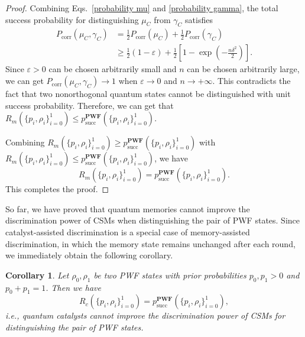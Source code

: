 \documentclass[aps,pra,twocolumn,floatfix,amsfonts,10pt]{revtex4-2}
\newtheorem{corollary}{Corollary}
\begin{document}
\begin{proof}
	Combining Eqs.~\eqref{probability mu} and \eqref{probability gamma}, the total success probability for distinguishing $\mu_C$ from $\gamma_C$ satisfies
	\begin{equation}
		\begin{aligned}
			P_{\mathrm{corr}}(\mu_C,\gamma_C) &= \frac{1}{2}P_{\mathrm{corr}}(\mu_C) + \frac{1}{2}P_{\mathrm{corr}}(\gamma_C) \\ &\geqslant \frac{1}{2}(1-\varepsilon) + \frac{1}{2} \left[ 1-\exp\left(-\frac{n\delta^2}{2}\right)\right].
		\end{aligned}
	\end{equation}
	Since $\varepsilon>0$ can be chosen arbitrarily small and $n$ can be chosen arbitrarily large, we can get $P_{\mathrm{corr}}(\mu_C,\gamma_C) \rightarrow 1$ when $\varepsilon \rightarrow 0$ and $n \rightarrow + \infty$. 
	This contradicts the fact that two nonorthogonal quantum states cannot be distinguished with unit success probability.
	Therefore, we can get that $R_m\left(\{p_i,\rho_i\}_{i=0}^{1}\right) \leqslant p_{\mathrm{succ}}^{\mathbf{PWF}}\left(\{p_i,\rho_i\}_{i=0}^{1}\right)$.
	
	Combining $R_m\left(\{p_i,\rho_i\}_{i=0}^{1}\right) \geqslant p_{\mathrm{succ}}^{\mathbf{PWF}}\left(\{p_i,\rho_i\}_{i=0}^{1}\right)$ with $R_m\left(\{p_i,\rho_i\}_{i=0}^{1}\right) \leqslant p_{\mathrm{succ}}^{\mathbf{PWF}}\left(\{p_i,\rho_i\}_{i=0}^{1}\right)$, we have
	\begin{equation}
		R_m\left(\{p_i,\rho_i\}_{i=0}^{1}\right) = p_{\mathrm{succ}}^{\mathbf{PWF}}\left(\{p_i,\rho_i\}_{i=0}^{1}\right).
	\end{equation}
	This completes the proof.
\end{proof}

So far, we have proved that quantum memories cannot improve the discrimination power of CSMs when distinguishing the pair of PWF states.
Since catalyst-assisted discrimination is a special case of memory-assisted discrimination, in which the memory state remains unchanged after each round, we immediately obtain the following corollary.

\begin{corollary}
	Let $\rho_0,\rho_1$ be two PWF states with prior probabilities $p_0,p_1>0$ and $p_0+p_1=1$. 
	Then we have
	\begin{equation}
		R_c\left(\{p_i,\rho_i\}_{i=0}^{1}\right) = p_{\mathrm{succ}}^{\mathbf{PWF}}\left(\{p_i,\rho_i\}_{i=0}^{1}\right),
	\end{equation}
	i.e., quantum catalysts cannot improve the discrimination power of CSMs for distinguishing the pair of PWF states.
\end{corollary}
\end{document}

